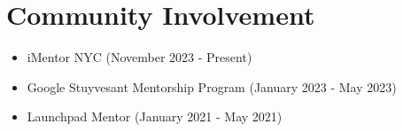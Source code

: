 \documentclass[letterpaper,11pt]{article}
\newcommand{\resumeItem}[1]{
  \item\small{
    {#1 \vspace{-2pt}}
  }
}
\begin{document}
\section{Community Involvement}
 \begin{itemize}[leftmargin=0.15in]
    \resumeItem{
     {iMentor NYC (November 2023 - Present)}
    }
    \vspace{-5pt}
    \resumeItem{
     {Google Stuyvesant Mentorship Program (January 2023 - May 2023})
    }
    \vspace{-5pt}
    \resumeItem{
     {Launchpad Mentor (January 2021 - May 2021})
    }
 \end{itemize}
 \vspace{-16pt}
\end{document}
